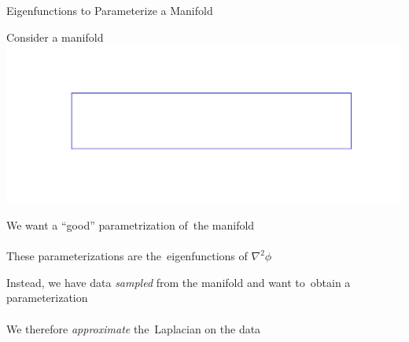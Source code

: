 \documentclass[12pt]{beamer}
\begin{document}
\begin{frame}{Eigenfunctions to Parameterize a Manifold}

    {\scriptsize
    \begin{minipage}[t]{0.3\textwidth}
        \centering
        Consider a manifold\\
        \includegraphics[width=\textwidth]{rect.jpg}\\


    \end{minipage}
    \begin{minipage}[t]{0.35\textwidth}
        \centering
        We want a ``good'' parametrization of~the manifold\\
        \vspace{0.1in}
        \\
        \vspace{-0.03in}
        These parameterizations are the~eigenfunctions of $\nabla^2 \phi$\\
    \end{minipage}
    \begin{minipage}[t]{0.3\textwidth}
        \centering
        Instead, we have data {\em sampled} from the manifold and want to~obtain a parameterization\\
        \vspace{0.1in}
        \\
        \vspace{0.1in}
        We therefore {\em approximate} the~Laplacian on the data
    \end{minipage}
    \par}

    \vspace{0.1in}


\end{frame}
\end{document}
